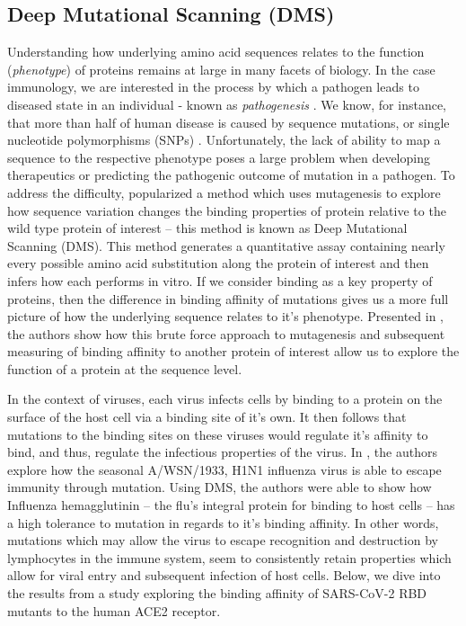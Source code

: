 \documentclass{article}
\begin{document}
\subsection*{Deep Mutational Scanning (DMS)}

Understanding how underlying amino acid sequences relates to the function (\textit{phenotype}) of proteins remains at large in many facets of biology.
In the case immunology, we are interested in the process by which a pathogen leads to diseased state in an individual - known as \textit{pathogenesis} \citep{Araya2011, Fowler2014, Weile2018}.
We know, for instance, that more than half of human disease is caused by sequence mutations, or single nucleotide polymorphisms (SNPs) \citep{Stenson2009}.
Unfortunately, the lack of ability to map a sequence to the respective phenotype poses a large problem when developing therapeutics or predicting the pathogenic outcome of mutation in a pathogen.
To address the difficulty, \citep{Araya2011} popularized a method which uses mutagenesis to explore how sequence variation changes the binding properties of protein relative to the wild type protein of interest -- this method is known as Deep Mutational Scanning (DMS).
This method generates a quantitative assay containing nearly every possible amino acid substitution along the protein of interest and then infers how each performs in vitro.
If we consider binding as a key property of proteins, then the difference in binding affinity of mutations gives us a more full picture of how the underlying sequence relates to it's phenotype.
Presented in \citet{Adams2016}, the authors show how this brute force approach to mutagenesis and subsequent measuring of binding affinity to another protein of interest allow us to explore the function of a protein at the sequence level.

In the context of viruses, each virus infects cells by binding to a protein on the surface of the host cell via a binding site of it's own.
It then follows that mutations to the binding sites on these viruses would regulate it's affinity to bind, and thus, regulate the infectious properties of the virus.
In \citet{Bloom2014}, the authors explore how the seasonal A/WSN/1933, H1N1 influenza virus is able to escape immunity through mutation.
Using DMS, the authors were able to show how Influenza hemagglutinin -- the flu's integral protein for binding to host cells -- has a high tolerance to mutation in regards to it's binding affinity.
In other words, mutations which may allow the virus to escape recognition and destruction by lymphocytes in the immune system, seem to consistently retain properties which allow for viral entry and subsequent infection of host cells.
Below, we dive into the results from a study exploring the binding affinity of SARS-CoV-2 RBD mutants to the human ACE2 receptor.
\end{document}
